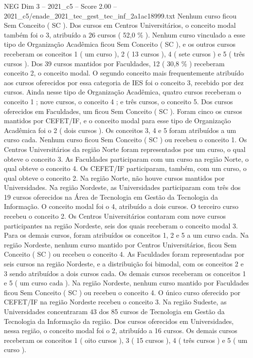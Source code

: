\begin{textsample}{NEG Dim 3 – 2021\_c5 – Score 2.00 – 2021\_c5/enade\_2021\_tec\_gest\_tec\_inf\_2a1ac18999.txt}
Nenhum curso ficou Sem Conceito ( SC ).
Dos cursos em Centros Universitários, o conceito modal também foi o 3, atribuído a 26 cursos ( 52,0 \% ).
Nenhum curso vinculado a esse tipo de Organização Acadêmica ficou Sem Conceito ( SC ), e os outros cursos receberam os conceitos 1 ( um curso ), 2 ( 13 cursos ), 4 ( sete cursos ) e 5 ( três cursos ).
Dos 39 cursos mantidos por Faculdades, 12 ( 30,8 \% ) receberam conceito 2, o conceito modal.
O segundo conceito mais frequentemente atribuído aos cursos oferecidos por essa categoria de IES foi o conceito 3, recebido por dez cursos.
Ainda nesse tipo de Organização Acadêmica, quatro cursos receberam o conceito 1 ; nove cursos, o conceito 4 ; e três cursos, o conceito 5.
Dos cursos oferecidos em Faculdades, um ficou Sem Conceito ( SC ).
Foram cinco os cursos mantidos por CEFET/IF, e o conceito modal para esse tipo de Organização Acadêmica foi o 2 ( dois cursos ).
Os conceitos 3, 4 e 5 foram atribuídos a um curso cada.
Nenhum curso ficou Sem Conceito ( SC ) ou recebeu o conceito 1.
Os Centros Universitários da região Norte foram representados por um curso, o qual obteve o conceito 3.
As Faculdades participaram com um curso na região Norte, o qual obteve o conceito 4.
Os CEFET/IF participaram, também, com um curso, o qual obteve o conceito 2.
Na região Norte, não houve cursos mantidos por Universidades.
Na região Nordeste, as Universidades participaram com três dos 19 cursos oferecidos na Área de Tecnologia em Gestão da Tecnologia da Informação.
O conceito modal foi o 4, atribuído a dois cursos.
O terceiro curso recebeu o conceito 2.
Os Centros Universitários contaram com nove cursos participantes na região Nordeste, seis dos quais receberam o conceito modal 3.
Para os demais cursos, foram atribuídos os conceitos 1, 2 e 5 a um curso cada.
Na região Nordeste, nenhum curso mantido por Centros Universitários, ficou Sem Conceito ( SC ) ou recebeu o conceito 4.
As Faculdades foram representadas por seis cursos na região Nordeste, e a distribuição foi bimodal, com os conceitos 2 e 3 sendo atribuídos a dois cursos cada.
Os demais cursos receberam os conceitos 1 e 5 ( um curso cada ).
Na região Nordeste, nenhum curso mantido por Faculdades ficou Sem Conceito ( SC ) ou recebeu o conceito 4.
O único curso oferecido por CEFET/IF na região Nordeste recebeu o conceito 3.
Na região Sudeste, as Universidades concentraram 43 dos 85 cursos de Tecnologia em Gestão da Tecnologia da Informação da região.
Dos cursos oferecidos em Universidades, nessa região, o conceito modal foi o 2, atribuído a 16 cursos.
Os demais cursos receberam os conceitos 1 ( oito cursos ), 3 ( 15 cursos ), 4 ( três cursos ) e 5 ( um curso ).

\end{textsample}
